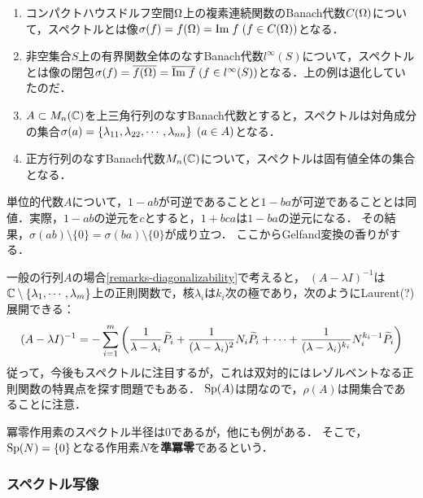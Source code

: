 \documentclass[uplatex,dvipdfmx]{jsreport}
\begin{document}
\begin{example}\mbox{}
    \begin{enumerate}
        \item コンパクトハウスドルフ空間$\Omega$上の複素連続関数のBanach代数$C(\Omega)$について，スペクトルとは像$\sigma(f)=f(\Omega)=\mathrm{Im}\; f\;(f\in C(\Omega))$となる．
        \item 非空集合$S$上の有界関数全体のなすBanach代数$l^\infty(S)$について，スペクトルとは像の閉包$\sigma(f)=\overline{f(\Omega)}=\overline{\mathrm{Im}\; f}\;(f\in l^\infty(S))$となる．上の例は退化していたのだ．
        \item $A\subset M_n(\mathbb{C})$を上三角行列のなすBanach代数とすると，スペクトルは対角成分の集合$\sigma(a)=\left\{\lambda_{11},\lambda_{22},\cdots,\lambda_{nn}\right\}\;(a\in A)$となる．
        \item 正方行列のなすBanach代数$M_n(\mathbb{C})$について，スペクトルは固有値全体の集合となる．
    \end{enumerate}
\end{example}
\begin{remark}[スペクトルは非可換性を区別しない]
    単位的代数$A$について，$1-ab$が可逆であることと$1-ba$が可逆であることとは同値．実際，$1-ab$の逆元を$c$とすると，$1+bca$は$1-ba$の逆元になる．
    その結果，$\sigma(ab)\setminus\{0\}=\sigma(ba)\setminus\{0\}$が成り立つ．
    ここからGelfand変換の香りがする．
\end{remark}

\begin{example}[レゾルベント]
    一般の行列$A$の場合\ref{remarks-diagonalizability}で考えると，
    $(A-\lambda I)^{-1}$は$\mathbb{C}\setminus\{\lambda_1,\cdots,\lambda_m\}$上の正則関数で，核$\lambda_i$は$k_i$次の極であり，次のようにLaurent(?)展開できる：
    \[(A-\lambda I)^{-1}=-\sum^m_{i=1}\left(\frac{1}{\lambda-\lambda_i}\widetilde{P}_i+\frac{1}{(\lambda-\lambda_i)^2}N_i\widetilde{P}_i+\cdots+\frac{1}{(\lambda-\lambda_i)^{k_i}}N_i^{k_i-1}\widetilde{P}_i\right)\]
    従って，今後もスペクトルに注目するが，これは双対的にはレゾルベントなる正則関数の特異点を探す問題でもある．
    $\mathrm{Sp}(A)$は閉なので，$\rho(A)$は開集合であることに注意．
\end{example}

\begin{example}[quasinilpotent]
    冪零作用素のスペクトル半径は$0$であるが，他にも例がある．
    そこで，$\mathrm{Sp}(N)=\{0\}$となる作用素$N$を\textbf{準冪零}であるという．
\end{example}

\subsubsection{スペクトル写像}
\end{document}
